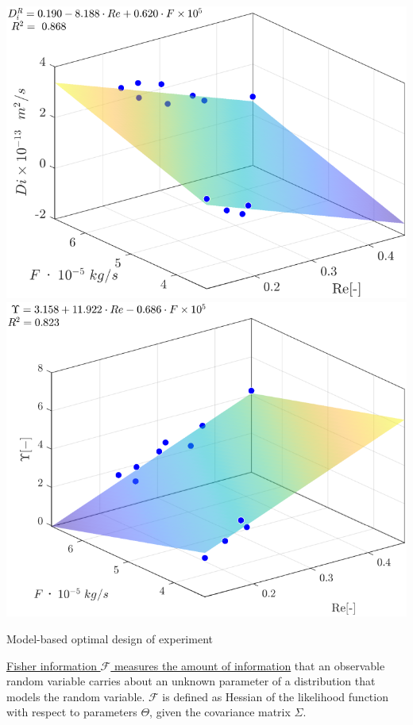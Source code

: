 \documentclass[a0,portrait]{a0poster}
\begin{document}
\begin{multicols}{2}
\begin{tcolorbox}[width=\linewidth, boxrule=0mm, sharp corners=all, colback=white]
\begin{center}\vspace{0.5cm}
	\includegraphics[width=0.49\linewidth]{Di_Re_F_1.png}
	\includegraphics[width=0.49\linewidth]{Gamma_Re_F_1.png}
\end{center}%

\end{tcolorbox}

\begin{tcolorbox}[width=\linewidth, boxrule=0mm, sharp corners=all, colback=white]
\begin{tcolorbox}[width=\linewidth, boxrule=0mm, sharp corners=all, colback=white]
	{\LARGE Model-based optimal design of experiment\\}
\end{tcolorbox}

\underline{Fisher information $\mathcal{F}$ measures the amount of information} that an observable random variable carries about an unknown parameter of a distribution that models the random variable. $\mathcal{F}$ is defined as Hessian of the likelihood function with respect to parameters $\Theta$, given the covariance matrix $\Sigma$. %


\end{tcolorbox}
\end{multicols}
\end{document}

